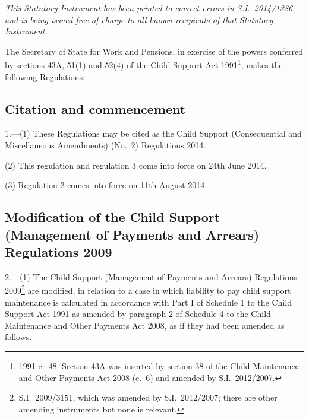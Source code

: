 \documentclass[12pt,a4paper]{article}
\title{\regstitle}
\author{S.I.\ 2014 No.\ 1621}
\date{Made
23rd June 2014\\
Laid before Parliament
23rd June 2014\\
Coming into force
in accordance with regulation 1
}
\begin{document}
\maketitle

\begin{center}
\itshape This Statutory Instrument has been printed to correct errors in S.I.~2014/1386 and is being issued free of charge to all known recipients of that Statutory Instrument. 
\end{center}

\enlargethispage{\baselineskip}

\noindent
The Secretary of State for Work and Pensions, in exercise of the powers conferred by sections 43A, 51(1) and 52(4) of the Child Support Act 1991\footnote{1991 c.~48. Section 43A was inserted by section 38 of the Child Maintenance and Other Payments Act 2008 (c.~6) and amended by S.I.~2012/2007.}, makes the following Regulations: 

{\sloppy

\tableofcontents

}

\bigskip

\setcounter{secnumdepth}{-2}

\subsection[1. Citation and commencement]{Citation and commencement}

1.—(1) These Regulations may be cited as the Child Support (Consequential and Miscellaneous Amendments) (No.~2) Regulations 2014.

(2) This regulation and regulation 3 come into force on 24th June 2014.

(3) Regulation 2 comes into force on 11th August 2014.

\subsection[2. Modification of the Child Support (Management of Payments and Arrears) Regulations 2009]{Modification of the Child Support (Management of Payments and Arrears) Regulations 2009}

2.—(1) The Child Support (Management of Payments and Arrears) Regulations 2009\footnote{S.I.~2009/3151, which was amended by S.I.~2012/2007; there are other amending instruments but none is relevant.} are modified, in relation to a case in which liability to pay child support maintenance is calculated in accordance with Part I of Schedule 1 to the Child Support Act 1991 as amended by paragraph 2 of Schedule 4 to the Child Maintenance and Other Payments Act 2008, as if they had been amended as follows.
\end{document}
